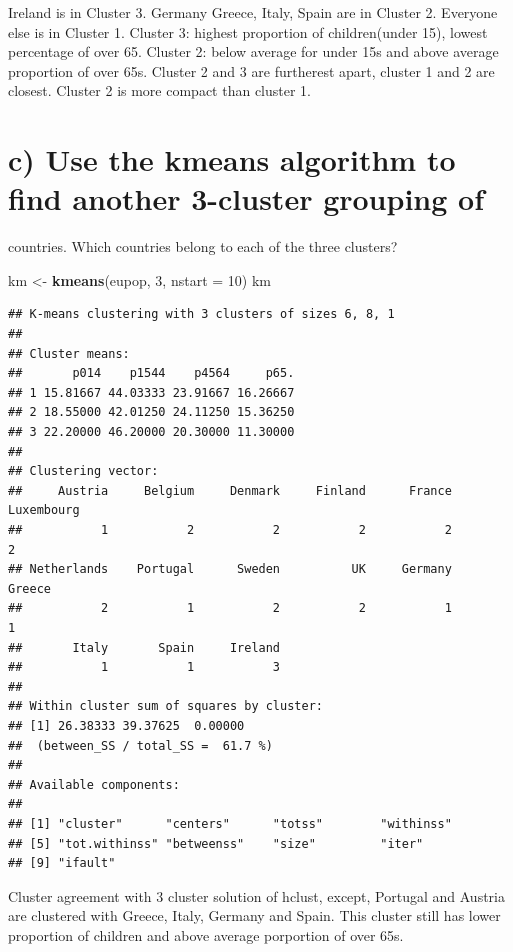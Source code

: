 \documentclass[]{article}
\newenvironment{Shaded}{\begin{snugshade}}{\end{snugshade}}
\newcommand{\DataTypeTok}[1]{\textcolor[rgb]{0.13,0.29,0.53}{#1}}
\newcommand{\DecValTok}[1]{\textcolor[rgb]{0.00,0.00,0.81}{#1}}
\newcommand{\KeywordTok}[1]{\textcolor[rgb]{0.13,0.29,0.53}{\textbf{#1}}}
\newcommand{\NormalTok}[1]{#1}
\newcommand{\StringTok}[1]{\textcolor[rgb]{0.31,0.60,0.02}{#1}}
\begin{document}
Ireland is in Cluster 3. Germany Greece, Italy, Spain are in Cluster 2.
Everyone else is in Cluster 1. Cluster 3: highest proportion of
children(under 15), lowest percentage of over 65. Cluster 2: below
average for under 15s and above average proportion of over 65s. Cluster
2 and 3 are furtherest apart, cluster 1 and 2 are closest. Cluster 2 is
more compact than cluster 1.

\hypertarget{c-use-the-kmeans-algorithm-to-find-another-3-cluster-grouping-of}{%
\section{c) Use the kmeans algorithm to find another 3-cluster grouping
of}\label{c-use-the-kmeans-algorithm-to-find-another-3-cluster-grouping-of}}

countries. Which countries belong to each of the three clusters?

\begin{Shaded}
\begin{Highlighting}[]
\NormalTok{km <-}\StringTok{ }\KeywordTok{kmeans}\NormalTok{(eupop, }\DecValTok{3}\NormalTok{, }\DataTypeTok{nstart =} \DecValTok{10}\NormalTok{)}
\NormalTok{km}
\end{Highlighting}
\end{Shaded}

\begin{verbatim}
## K-means clustering with 3 clusters of sizes 6, 8, 1
## 
## Cluster means:
##       p014    p1544    p4564     p65.
## 1 15.81667 44.03333 23.91667 16.26667
## 2 18.55000 42.01250 24.11250 15.36250
## 3 22.20000 46.20000 20.30000 11.30000
## 
## Clustering vector:
##     Austria     Belgium     Denmark     Finland      France  Luxembourg 
##           1           2           2           2           2           2 
## Netherlands    Portugal      Sweden          UK     Germany      Greece 
##           2           1           2           2           1           1 
##       Italy       Spain     Ireland 
##           1           1           3 
## 
## Within cluster sum of squares by cluster:
## [1] 26.38333 39.37625  0.00000
##  (between_SS / total_SS =  61.7 %)
## 
## Available components:
## 
## [1] "cluster"      "centers"      "totss"        "withinss"    
## [5] "tot.withinss" "betweenss"    "size"         "iter"        
## [9] "ifault"
\end{verbatim}

Cluster agreement with 3 cluster solution of hclust, except, Portugal
and Austria are clustered with Greece, Italy, Germany and Spain. This
cluster still has lower proportion of children and above average
porportion of over 65s.
\end{document}
